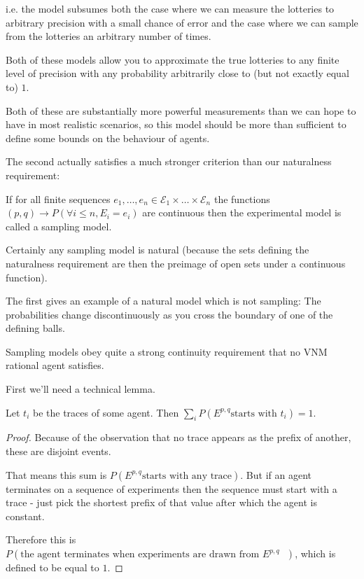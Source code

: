 i.e. the model subsumes both the case where we can measure  the lotteries to arbitrary
precision with a small chance of error and the case where we can sample from the
lotteries an arbitrary number of times.

Both of these models allow you to approximate the true lotteries to any
finite level of precision with any probability arbitrarily close to (but not exactly
equal to) $1$.

Both of these are substantially more powerful measurements than we can hope to have in
most realistic scenarios, so this model should be more than sufficient to define some
bounds on the behaviour of agents.

The second actually satisfies a much stronger criterion than our naturalness
requirement:

\begin{definition}
If for all finite sequences $e_1, \ldots, e_n \in \mathcal{E}_1 \times \ldots \times \mathcal{E}_n$
the functions $(p, q) \to P(\forall i \leq n, E_i = e_i)$ are continuous then 
the experimental model is called a sampling model.
\end{definition}

Certainly any sampling model is natural (because the sets defining the naturalness
requirement are then the preimage of open sets under a continuous function).

The first gives an example of a natural model which is not sampling: The probabilities
change discontinuously as you cross the boundary of one of the defining balls.

Sampling models obey quite a strong continuity requirement that no
VNM rational agent satisfies.

First we'll need a technical lemma.

\begin{lemma}
Let $t_i$ be the traces of some agent. Then 
$\sum\limits_i P(E^{p, q} \text{starts with $t_i$}) = 1$.
\end{lemma}

\begin{proof}
Because of the observation that no trace appears as the prefix of another, these are disjoint events.

That means this sum is $P(E^{p, q} \text{starts with any trace})$.
But if an agent terminates on a sequence of experiments then the
sequence must start with a trace - just pick the shortest prefix of that value
after which the agent is constant.

Therefore this is
$P(\text{the agent terminates when experiments are drawn from $E^{p, q}$ })$,
which is defined to be equal to $1$.
\end{proof}

